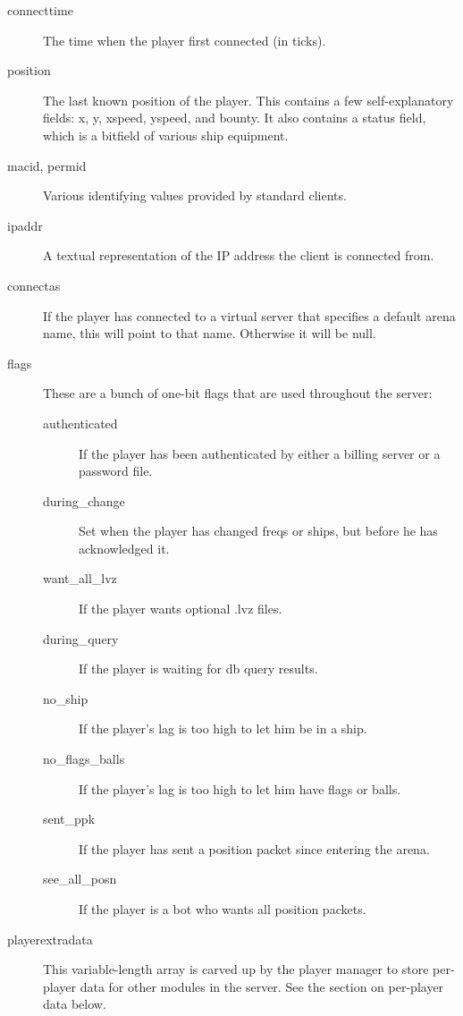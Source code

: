 \documentclass{article}
\begin{document}
\begin{description}
\item[connecttime] The time when the player first connected (in ticks).

\item[position] The last known position of the player. This contains a
few self-explanatory fields: x, y, xspeed, yspeed, and bounty. It also
contains a status field, which is a bitfield of various ship equipment.

\item[macid, permid] Various identifying values provided by standard
clients.

\item[ipaddr] A textual representation of the IP address the client is
connected from.

\item[connectas] If the player has connected to a virtual server that
specifies a default arena name, this will point to that name. Otherwise
it will be null.

\item[flags] These are a bunch of one-bit flags that are used throughout
the server:

\begin{description}

\item[authenticated] If the player has been authenticated by either a
billing server or a password file.

\item[during\_change] Set when the player has changed freqs or ships,
but before he has acknowledged it.

\item[want\_all\_lvz] If the player wants optional .lvz files.

\item[during\_query] If the player is waiting for db query results.

\item[no\_ship] If the player's lag is too high to let him be in a ship.

\item[no\_flags\_balls] If the player's lag is too high to let him have
flags or balls.

\item[sent\_ppk] If the player has sent a position packet since entering
the arena.

\item[see\_all\_posn] If the player is a bot who wants all position
packets.

\end{description}

\item[playerextradata] This variable-length array is carved up by the
player manager to store per-player data for other modules in the server.
See the section on per-player data below.

\end{description}
\end{document}
